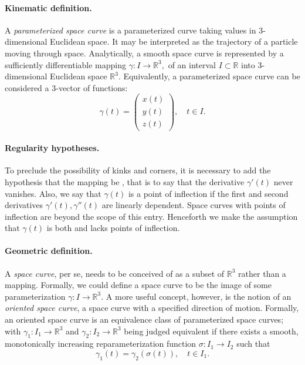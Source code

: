 \documentclass{article}
\newcommand{\reals}{\mathbb{R}}
\begin{document}
\paragraph{Kinematic definition.}
A \emph{parameterized space curve} is a parameterized curve taking
values in 3-dimensional Euclidean space.  It may be interpreted as the
trajectory of a particle moving through space.  Analytically, a smooth
space curve is represented by a sufficiently differentiable mapping
$\gamma:I \to \reals^3, $ of an interval $I\subset \reals$ into
3-dimensional Euclidean space $\reals^3$.  Equivalently, a
parameterized space curve can be considered a 3-vector of functions:
$$\gamma(t) =
\begin{pmatrix}
  x(t)\\ y(t) \\ z(t)
\end{pmatrix},\quad t\in I.$$

\paragraph{Regularity hypotheses.}
To preclude the possibility of kinks and corners, it is
necessary to add the hypothesis that the mapping be , that is
to say that the derivative $\gamma'(t)$ never vanishes.  Also, we say
that $\gamma(t)$ is a point of inflection if the first and second
derivatives $\gamma'(t), \gamma''(t)$ are linearly dependent.  Space curves
with points of inflection are beyond the scope of this entry.
Henceforth we make the assumption that $\gamma(t)$ is both  and
lacks points of inflection.

\paragraph{Geometric definition.}
A \emph{space curve}, per se, needs to be conceived of as a subset of
$\reals^3$ rather than a mapping.  Formally, we could define a space
curve to be the image of some parameterization $\gamma:I\to\reals^3$.  A
more useful concept, however, is the notion of an \emph{oriented space
  curve}, a space curve with a specified direction of motion.
Formally, an oriented space curve is an equivalence class of
parameterized space curves; with $\gamma_1:I_1\to\reals^3$ and
$\gamma_2:I_2\to\reals^3$ being judged equivalent if there exists a
smooth, monotonically increasing reparameterization function $\sigma:
I_1\to I_2$ such that
$$\gamma_1(t) = \gamma_2(\sigma(t)),\quad t\in I_1.$$
\end{document}
